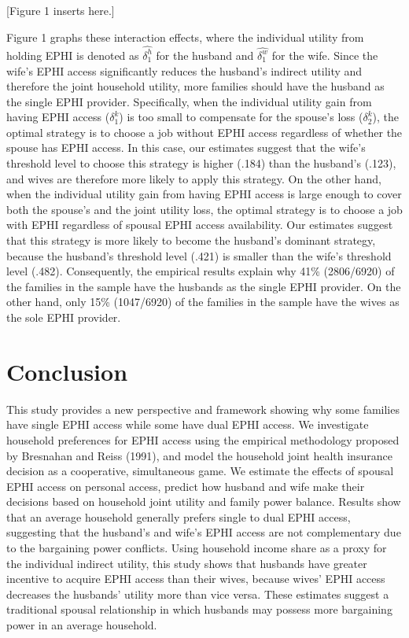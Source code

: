 \documentclass[legno,11pt]{article}
\begin{document}
\begin{center}
[Figure 1 inserts here.]
\end{center}
Figure 1 graphs these interaction effects, where the individual
utility from holding EPHI is denoted as $\widehat{\delta^{h}_{1}}$
for the husband and $\widehat{\delta^{w}_{1}}$ for the wife.
Since
the wife's EPHI access significantly reduces the husband's indirect
utility and therefore the joint household utility, more families
should have the husband as the single EPHI provider. Specifically,
when the individual utility gain from having EPHI access ($\delta^{k}_{1}$) is too
small to compensate for the spouse's loss
($\delta^{k}_{2}$), the optimal strategy is to choose a
job without EPHI access regardless of whether the spouse has EPHI
access. In this case, our estimates suggest that the wife's
threshold level to choose this strategy is higher (.184) than the
husband's (.123), and wives are therefore more likely to apply this
strategy. On the other hand, when the individual utility gain from
having EPHI access is large enough to cover both the spouse's and
the joint utility loss, the optimal strategy is to choose a job with
EPHI regardless of spousal EPHI access availability. Our estimates suggest that this strategy is more likely to become the
husband's dominant strategy, because the husband's threshold level
(.421) is smaller than the wife's threshold level (.482).
Consequently, the empirical results explain why 41\% (2806/6920) of
the families in the sample have the husbands as the single EPHI
provider. On the other hand, only 15\% (1047/6920) of the families
in the sample have the wives as the sole EPHI provider.
\par


\section{Conclusion}\label{section6}
This study provides a new perspective and framework showing why some
families have single EPHI access while some have dual EPHI access.
We investigate household preferences for EPHI access using the
empirical methodology proposed by Bresnahan and Reiss (1991), and
model the household joint health insurance decision as a
cooperative, simultaneous game. We estimate the effects of spousal
EPHI access on personal access, predict how husband and wife make
their decisions based on household joint utility and family power balance. Results show that
an average household generally prefers single to dual EPHI access,
suggesting that the husband's and wife's EPHI access are not
complementary due to the bargaining power conflicts. Using household
income share as a proxy for the individual indirect utility, this
study shows that husbands have greater incentive to acquire EPHI
access than their wives, because wives' EPHI access decreases the
husbands' utility more than vice versa. These estimates suggest a
traditional spousal relationship in which husbands may possess more
bargaining power in an average household.
\par
\end{document}
